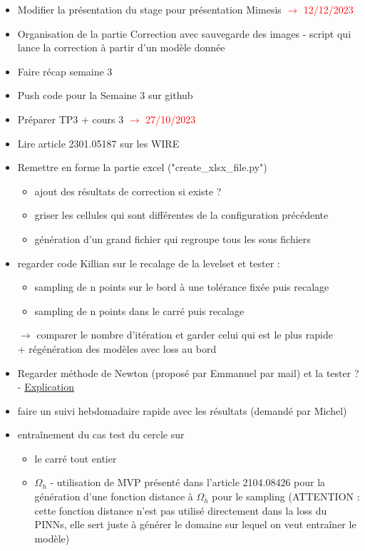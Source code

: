 \documentclass{article}
\begin{document}
	\begin{itemize}[label=$\square$]
		\item Modifier la présentation du stage pour présentation Mimesis \textcolor{red}{$\rightarrow$ 12/12/2023}
		\item Organisation de la partie Correction avec sauvegarde des images - script qui lance la correction à partir d'un modèle donnée
		\item Faire récap semaine 3
		\item Push code pour la Semaine 3 sur github
		\item Préparer TP3 + cours 3 \textcolor{red}{$\rightarrow$ 27/10/2023}
		\item Lire article 2301.05187 sur les WIRE
		\item Remettre en forme la partie excel ("create\_xlsx\_file.py")
		\begin{itemize}
			\item ajout des résultats de correction si existe ?
			\item griser les cellules qui sont différentes de la configuration précédente
			\item génération d'un grand fichier qui regroupe tous les sous fichiers
		\end{itemize}
		\item regarder code Killian sur le recalage de la levelset et tester :
		\begin{itemize}
			\item sampling de n points sur le bord à une tolérance fixée puis recalage
			\item sampling de n points dans le carré puis recalage
		\end{itemize}
		$\rightarrow$ comparer le nombre d'itération et garder celui qui est le plus rapide \\
		+ régénération des modèles avec loss au bord
		\item Regarder méthode de Newton (proposé par Emmanuel par mail) et la tester ? - \href{https://www.mathweb.fr/euclide/methode-de-newton/}{Explication}
		\item faire un suivi hebdomadaire rapide avec les résultats (demandé par Michel)
		\item entraînement du cas test du cercle sur 
		\begin{itemize}
			\item le carré tout entier
			\item $\Omega_h$ - utilisation de MVP présenté dans l'article 2104.08426 pour la génération d'une fonction distance à $\Omega_h$ pour le sampling (ATTENTION : cette fonction distance n'est pas utilisé directement dans la loss du PINNs, elle sert juste à générer le domaine sur lequel on veut entraîner le modèle)

\end{itemize}
\end{itemize}
\end{document}
